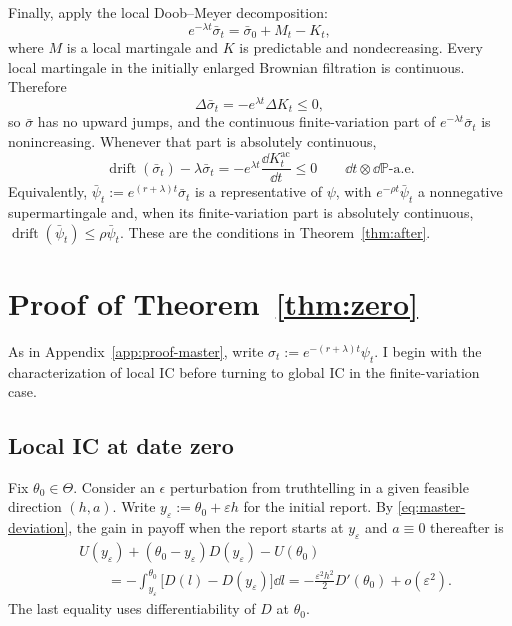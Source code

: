 \documentclass[12pt]{article}
\DeclareMathOperator{\drift}{drift}
\begin{document}
Finally, apply the local Doob--Meyer decomposition:
\[
  e^{-\lambda t}\bar\sigma_t
  =
  \bar\sigma_0+M_t-K_t,
\]
where \(M\) is a local martingale and \(K\) is predictable and
nondecreasing. Every local martingale in the initially enlarged Brownian
filtration is continuous. Therefore
\[
  \Delta\bar\sigma_t
  =
  -e^{\lambda t}\Delta K_t
  \leq0,
\]
so \(\bar\sigma\) has no upward jumps, and the continuous
finite-variation part of \(e^{-\lambda t}\bar\sigma_t\) is
nonincreasing. Whenever that part is absolutely continuous,
\[
  \drift(\bar\sigma_t)-\lambda\bar\sigma_t
  =
  -e^{\lambda t}\frac{\dd K_t^{\mathrm{ac}}}{\dd t}
  \leq0
  \qquad
  \dd t\otimes\dd\mathbb P\text{-a.e.}
\]
Equivalently, \(\bar\psi_t:=e^{(r+\lambda)t}\bar\sigma_t\)
is a representative of \(\psi\), with
\(e^{-\rho t}\bar\psi_t\) a nonnegative supermartingale and,
when its finite-variation part is absolutely continuous,
\(\drift(\bar\psi_t)\leq\rho\bar\psi_t\).
These are the conditions in Theorem~\ref{thm:after}.

\section{Proof of Theorem~\ref{thm:zero}}
\label{app:proof-zero}

As in Appendix~\ref{app:proof-master}, write
\(\sigma_t:=e^{-(r+\lambda)t}\psi_t\). I begin with the characterization of local IC before turning to global IC in the finite-variation case. 

\subsection{Local IC at date zero}\label{sub:zero-local}

Fix \(\theta_0\in\Theta\). Consider an $\epsilon$ perturbation from truthtelling in a given feasible direction \((h,a)\). Write
\(
  y_\varepsilon:=\theta_0+\varepsilon h
\)
for the initial report. By \eqref{eq:master-deviation}, the gain in payoff when the report starts at \(y_\varepsilon\) and
\(a\equiv0\) thereafter is
\begin{equation}\label{eq:env-part}
\begin{split}
&U(y_\varepsilon)+(\theta_0-y_\varepsilon)D(y_\varepsilon)
  -U(\theta_0)\\
&\qquad
=-\int_{y_\varepsilon}^{\theta_0}
  \big[D(l)-D(y_\varepsilon)\big]\dd l
=-\frac{\varepsilon^2h^2}{2}D'(\theta_0)+o(\varepsilon^2).
\end{split}
\end{equation}
The last equality uses differentiability of \(D\) at \(\theta_0\).
\end{document}
